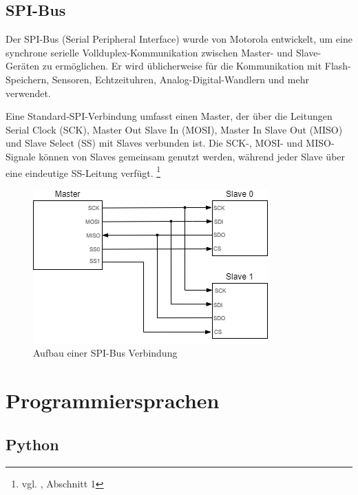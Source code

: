 \subsection{SPI-Bus}

Der SPI-Bus (Serial Peripheral Interface) wurde von Motorola entwickelt, um eine synchrone serielle Vollduplex-Kommunikation zwischen Master- und Slave-Geräten zu ermöglichen. Er wird üblicherweise für die Kommunikation mit Flash-Speichern, Sensoren, Echtzeituhren, Analog-Digital-Wandlern und mehr verwendet.\\ \medskip

Eine Standard-SPI-Verbindung umfasst einen Master, der über die Leitungen Serial Clock (SCK), Master Out Slave In (MOSI), Master In Slave Out (MISO) und Slave Select (SS) mit Slaves verbunden ist. Die SCK-, MOSI- und MISO-Signale können von Slaves gemeinsam genutzt werden, während jeder Slave über eine eindeutige SS-Leitung verfügt. \footnote{vgl. \cite{spi}, Abschnitt 1}

\begin{figure}[H]
	\begin{center}
		\includegraphics[scale=0.5]{figures/hcis/spi_master_slave.png}
		\caption{Aufbau einer SPI-Bus Verbindung}
	\end{center}
\end{figure}

\newpage

\section{Programmiersprachen}

\subsection{Python}

